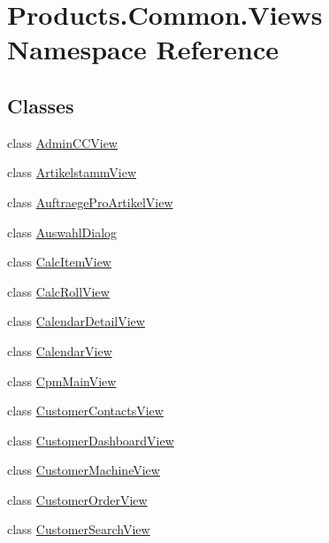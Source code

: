 \hypertarget{namespace_products_1_1_common_1_1_views}{}\section{Products.\+Common.\+Views Namespace Reference}
\label{namespace_products_1_1_common_1_1_views}
\subsection*{Classes}
\begin{DoxyCompactItemize}
\item 
class \hyperlink{class_products_1_1_common_1_1_views_1_1_admin_c_c_view}{Admin\+C\+C\+View}
\item 
class \hyperlink{class_products_1_1_common_1_1_views_1_1_artikelstamm_view}{Artikelstamm\+View}
\item 
class \hyperlink{class_products_1_1_common_1_1_views_1_1_auftraege_pro_artikel_view}{Auftraege\+Pro\+Artikel\+View}
\item 
class \hyperlink{class_products_1_1_common_1_1_views_1_1_auswahl_dialog}{Auswahl\+Dialog}
\item 
class \hyperlink{class_products_1_1_common_1_1_views_1_1_calc_item_view}{Calc\+Item\+View}
\item 
class \hyperlink{class_products_1_1_common_1_1_views_1_1_calc_roll_view}{Calc\+Roll\+View}
\item 
class \hyperlink{class_products_1_1_common_1_1_views_1_1_calendar_detail_view}{Calendar\+Detail\+View}
\item 
class \hyperlink{class_products_1_1_common_1_1_views_1_1_calendar_view}{Calendar\+View}
\item 
class \hyperlink{class_products_1_1_common_1_1_views_1_1_cpm_main_view}{Cpm\+Main\+View}
\item 
class \hyperlink{class_products_1_1_common_1_1_views_1_1_customer_contacts_view}{Customer\+Contacts\+View}
\item 
class \hyperlink{class_products_1_1_common_1_1_views_1_1_customer_dashboard_view}{Customer\+Dashboard\+View}
\item 
class \hyperlink{class_products_1_1_common_1_1_views_1_1_customer_machine_view}{Customer\+Machine\+View}
\item 
class \hyperlink{class_products_1_1_common_1_1_views_1_1_customer_order_view}{Customer\+Order\+View}
\item 
class \hyperlink{class_products_1_1_common_1_1_views_1_1_customer_search_view}{Customer\+Search\+View}

\end{DoxyCompactItemize}
